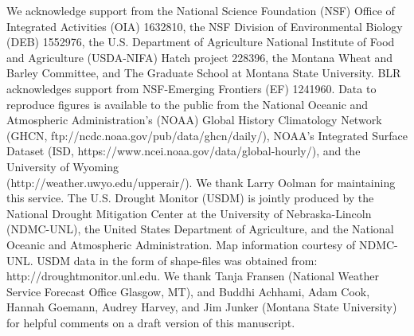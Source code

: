 \documentclass[hess, manuscript]{copernicus}
\begin{document}
\begin{acknowledgements}
\sloppy
We acknowledge support from the National Science Foundation (NSF) Office of Integrated Activities (OIA) 1632810, the NSF Division of Environmental Biology (DEB) 1552976, the U.S. Department of Agriculture National Institute of Food and Agriculture (USDA-NIFA) Hatch project 228396, the Montana Wheat and Barley Committee, and The Graduate School at Montana State University. BLR acknowledges support from NSF-Emerging Frontiers (EF) 1241960. Data to reproduce figures is available to the public from the National Oceanic and Atmospheric Administration’s (NOAA) Global History Climatology Network (GHCN, ftp://ncdc.noaa.gov/pub/data/ghcn/daily/), NOAA's Integrated Surface Dataset (ISD, https://www.ncei.noaa.gov/data/global-hourly/), and the University of Wyoming \\ %
(http://weather.uwyo.edu/upperair/). We thank Larry Oolman for maintaining this service. The U.S. Drought Monitor (USDM) is jointly produced by the National Drought Mitigation Center at the University of Nebraska-Lincoln (NDMC-UNL), the United States Department of Agriculture, and the National Oceanic and Atmospheric Administration. Map information courtesy of NDMC-UNL. USDM data in the form of shape-files was obtained from: http://droughtmonitor.unl.edu. We thank Tanja Fransen (National Weather Service Forecast Office Glasgow, MT), and Buddhi Achhami, Adam Cook, Hannah Goemann, Audrey Harvey, and Jim Junker (Montana State University) for helpful comments on a draft version of this manuscript. 
\fussy
\end{acknowledgements}







 
 
\end{document}
